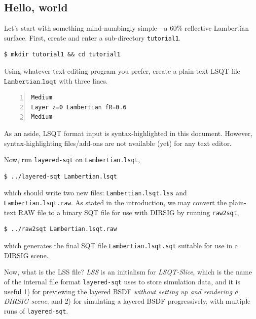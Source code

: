\documentclass[
    twoside,
    twocolumn,
    letterpaper,
    10pt]{article}
\begin{document}
\subsection{Hello, world}
\label{sec:tutorial1}

Let's start with something mind-numbingly simple---a 60\% 
reflective Lambertian surface. First, create and enter a 
sub-directory \texttt{tutorial1}.
\begin{verbatim}
$ mkdir tutorial1 && cd tutorial1
\end{verbatim}
Using whatever text-editing program you prefer, create a 
plain-text LSQT file $\texttt{Lambertian.lsqt}$ with three lines.
\begin{lstlisting}[numbers=left]
Medium
Layer z=0 Lambertian fR=0.6
Medium
\end{lstlisting}
As an aside, LSQT format input is syntax-highlighted in this 
document. However, syntax-highlighting files/add-ons are not
available (yet) for any text editor.

Now, run \texttt{layered-sqt} on \texttt{Lambertian.lsqt}, 
\begin{verbatim}
$ ../layered-sqt Lambertian.lsqt
\end{verbatim}
which should write two new files: \texttt{Lambertian.lsqt.lss} and
\texttt{Lambertian.lsqt.raw}. As stated in the introduction, we may
convert the plain-text RAW file to a binary SQT file for use with 
DIRSIG by running \texttt{raw2sqt},
\begin{verbatim}
$ ../raw2sqt Lambertian.lsqt.raw
\end{verbatim}
which generates the final SQT file \texttt{Lambertian.lsqt.sqt}
suitable for use in a DIRSIG scene.

Now, what is the LSS file?
\emph{LSS} is an initialism for \emph{LSQT-Slice}, which is the
name of the internal file format \texttt{layered-sqt} uses to store 
simulation data, and it is useful 1) for previewing the layered BSDF
\emph{without setting up and rendering a DIRSIG scene}, and 2) for
simulating a layered BSDF progressively, with multiple runs of 
\texttt{layered-sqt}.
\end{document}
